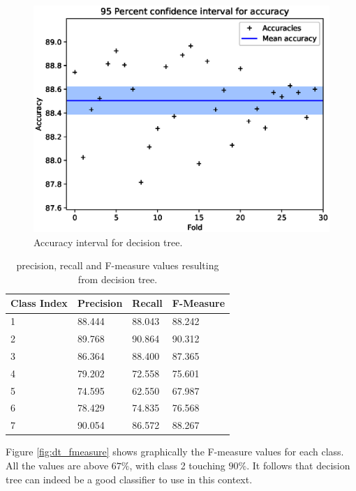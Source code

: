\documentclass[a4paper, 10pt]{article}
\begin{document}
\begin{figure}[H]
 \centering
 \includegraphics[width=0.8\linewidth]{pictures/decision_tree_accuracy_interval.eps}
 \caption{Accuracy interval for decision tree.}
 \label{fig:dt_accuracy}
\end{figure}

\begin{table}[H]
\centering
\begin{tabular}{|l|l|l|l|}
\hline
\textbf{Class Index} & \textbf{Precision} & \textbf{Recall} & \textbf{F-Measure}\\\hline
1 & 88.444 & 88.043& 88.242\\\hline
2 & 89.768 & 90.864& 90.312\\\hline
3 & 86.364 & 88.400& 87.365\\\hline
4 & 79.202 & 72.558& 75.601\\\hline
5 & 74.595 & 62.550& 67.987\\\hline
6 & 78.429 & 74.835& 76.568\\\hline
7 & 90.054 & 86.572& 88.267\\\hline
\end{tabular}
\caption{precision, recall and F-measure values resulting from decision tree.}
\label{tab:dt_cross_pr}
\end{table}

Figure \ref{fig:dt_fmeasure} shows graphically the F-measure values for each class. All the values are above $67\%$, with class 2 touching $90\%$. It follows that decision tree can indeed be a good classifier to use in this context.
\end{document}
